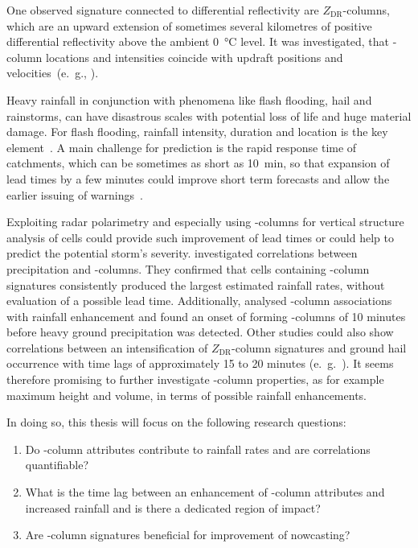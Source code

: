One observed signature connected to differential reflectivity are $Z_\text{DR}$-columns, which are an upward extension of sometimes several kilometres of positive differential reflectivity above the ambient \SI{0}{\degreeCelsius} level.
It was investigated, that \zdr-column locations and intensities coincide with updraft positions and velocities~(e.\ g., \textcite{bringiInSituZDR, loneyInSituZDR}). 

Heavy rainfall in conjunction with phenomena like flash flooding, hail and rainstorms, can have disastrous scales with potential loss of life and huge material damage. For flash flooding, rainfall intensity, duration and location is the key element~\cite{leon2016convective}. A main challenge for prediction is the rapid response time of catchments, which can be sometimes as short as \SI{10}{\minute}, so that expansion of lead times by a few minutes could improve short term forecasts and allow the earlier issuing of warnings~\cite{adachi2013detection}.

Exploiting radar polarimetry and especially using \zdr-columns for vertical structure analysis of cells could provide such improvement of lead times or could help to predict the potential storm's severity.
\textcite{RadarDerivedStructuralandPrecipitationCharacteristicsofZDRColumnswithinWarmSeasonConvectionovertheUnitedKingdom} investigated correlations between precipitation and \zdr-columns. They confirmed that cells containing \zdr-column signatures consistently produced the largest estimated rainfall rates, without evaluation of a possible lead time. Additionally, \textcite{adachi2013detection} analysed \zdr-column associations with rainfall enhancement and found an onset of forming \zdr-columns of 10 minutes before heavy ground precipitation was detected.
Other studies could also show correlations between an intensification of $Z_\text{DR}$-column signatures and ground hail occurrence with time lags of approximately 15 to 20 minutes (e.\ g.\ \textcite{picca2010zdr, kumijan2014}). It seems therefore promising to further investigate \zdr-column properties, as for example maximum height and volume, in terms of possible rainfall enhancements.

In doing so, this thesis will focus on the following research questions:
\begin{enumerate}
	\item Do \zdr-column attributes contribute to rainfall rates and are correlations quantifiable?
	\item What is the time lag between an enhancement of \zdr-column attributes and increased rainfall and is there a dedicated region of impact?
	\item Are \zdr-column signatures beneficial for improvement of nowcasting?
\end{enumerate}

